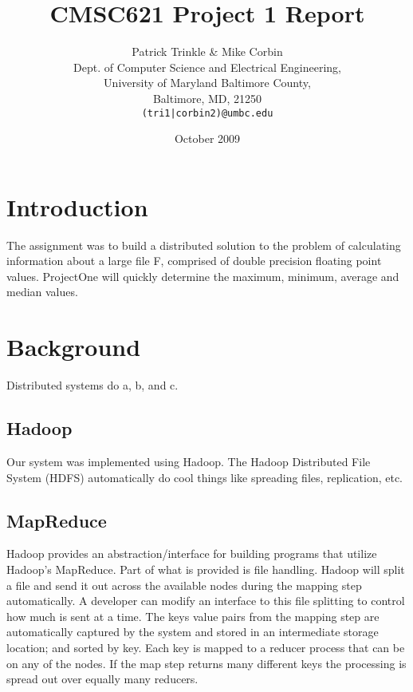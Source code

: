 \documentclass[11pt]{article}
\title{CMSC621 Project 1 Report}
\author{Patrick Trinkle \& Mike Corbin\\
Dept. of Computer Science and Electrical Engineering,\\
University of Maryland Baltimore County,\\
Baltimore, MD, 21250\\
\texttt{(tri1|corbin2)@umbc.edu}}
\date{October 2009}
\begin{document}
\maketitle

\section{Introduction}
The assignment was to build a distributed solution to the problem of calculating information about a large file F, comprised of double precision floating point values.  ProjectOne will quickly determine the maximum, minimum, average and median values.

\section{Background}
Distributed systems do a, b, and c.  

\subsection{Hadoop}
Our system was implemented using Hadoop.  The Hadoop Distributed File System (HDFS) automatically do cool things like spreading files, replication, etc.

\subsection{MapReduce}
Hadoop provides an abstraction/interface for building programs that utilize Hadoop's MapReduce.  Part of what is provided is file handling.  Hadoop will split a file and send it out across the available nodes during the mapping step automatically.  A developer can modify an interface to this file splitting to control how much is sent at a time.  The keys value pairs from the mapping step are automatically captured by the system and stored in an intermediate storage location; and sorted by key.  Each key is mapped to a reducer process that can be on any of the nodes.  If the map step returns many different keys the processing is spread out over equally many reducers.
\end{document}
